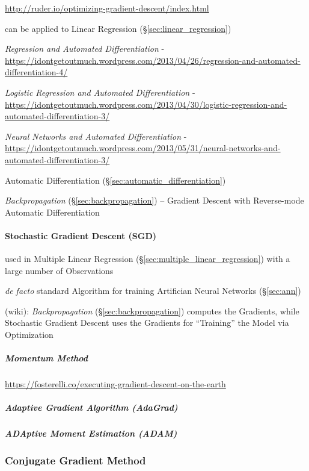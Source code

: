 \url{http://ruder.io/optimizing-gradient-descent/index.html}

can be applied to Linear Regression (\S\ref{sec:linear_regression})

\emph{Regression and Automated Differentiation} -
\url{https://idontgetoutmuch.wordpress.com/2013/04/26/regression-and-automated-differentiation-4/}

\emph{Logistic Regression and Automated Differentiation} -
\url{https://idontgetoutmuch.wordpress.com/2013/04/30/logistic-regression-and-automated-differentiation-3/}

\emph{Neural Networks and Automated Differentiation} -
\url{https://idontgetoutmuch.wordpress.com/2013/05/31/neural-networks-and-automated-differentiation-3/}

Automatic Differentiation (\S\ref{sec:automatic_differentiation})

\emph{Backpropagation} (\S\ref{sec:backpropagation}) -- Gradient Descent with
Reverse-mode Automatic Differentiation



\paragraph{Stochastic Gradient Descent (SGD)}\label{sec:sgd}\hfill

used in Multiple Linear Regression (\S\ref{sec:multiple_linear_regression}) with
a large number of Observations

\emph{de facto} standard Algorithm for training Artifician Neural Networks
(\S\ref{sec:ann})

(wiki): \emph{Backpropagation} (\S\ref{sec:backpropagation}) computes the
Gradients, while Stochastic Gradient Descent uses the Gradients for ``Training''
the Model via Optimization



\subparagraph{Momentum Method}\label{sec:momentum_method}\hfill

\url{https://fosterelli.co/executing-gradient-descent-on-the-earth}



\subparagraph{Adaptive Gradient Algorithm (AdaGrad)}\label{sec:adagrad}\hfill

\subparagraph{ADAptive Moment Estimation (ADAM)}\label{sec:adam}\hfill



\subsubsection{Conjugate Gradient Method}\label{sec:conjugate_gradient_method}

